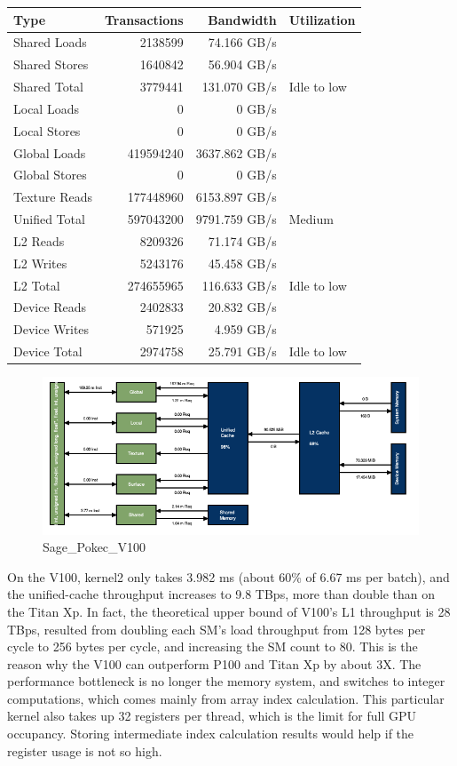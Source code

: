 \documentclass[10pt,oneside]{memoir}
\begin{document}
\begin{longtable}[]{@{}lrrl@{}}
\toprule
Type & Transactions & Bandwidth & Utilization\tabularnewline
\midrule
\endhead
Shared Loads & 2138599 & 74.166 GB/s &\tabularnewline
Shared Stores & 1640842 & 56.904 GB/s &\tabularnewline
Shared Total & 3779441 & 131.070 GB/s & Idle to low\tabularnewline
Local Loads & 0 & 0 GB/s &\tabularnewline
Local Stores & 0 & 0 GB/s &\tabularnewline
Global Loads & 419594240 & 3637.862 GB/s &\tabularnewline
Global Stores & 0 & 0 GB/s &\tabularnewline
Texture Reads & 177448960 & 6153.897 GB/s &\tabularnewline
Unified Total & 597043200 & 9791.759 GB/s & Medium\tabularnewline
L2 Reads & 8209326 & 71.174 GB/s &\tabularnewline
L2 Writes & 5243176 & 45.458 GB/s &\tabularnewline
L2 Total & 274655965 & 116.633 GB/s & Idle to low\tabularnewline
Device Reads & 2402833 & 20.832 GB/s &\tabularnewline
Device Writes & 571925 & 4.959 GB/s &\tabularnewline
Device Total & 2974758 & 25.791 GB/s & Idle to low\tabularnewline
\bottomrule
\end{longtable}

\begin{figure}
\centering
\includegraphics{attachments/sage/pokec_V100.png}
\caption{Sage\_Pokec\_V100}
\end{figure}

On the V100, kernel2 only takes 3.982 ms (about 60\% of 6.67 ms per
batch), and the unified-cache throughput increases to 9.8 TBps, more
than double than on the Titan Xp. In fact, the theoretical upper bound
of V100's L1 throughput is 28 TBps, resulted from doubling each SM's
load throughput from 128 bytes per cycle to 256 bytes per cycle, and
increasing the SM count to 80. This is the reason why the V100 can
outperform P100 and Titan Xp by about 3X. The performance bottleneck is
no longer the memory system, and switches to integer computations, which
comes mainly from array index calculation. This particular kernel also
takes up 32 registers per thread, which is the limit for full GPU
occupancy. Storing intermediate index calculation results would help if
the register usage is not so high.
\end{document}
